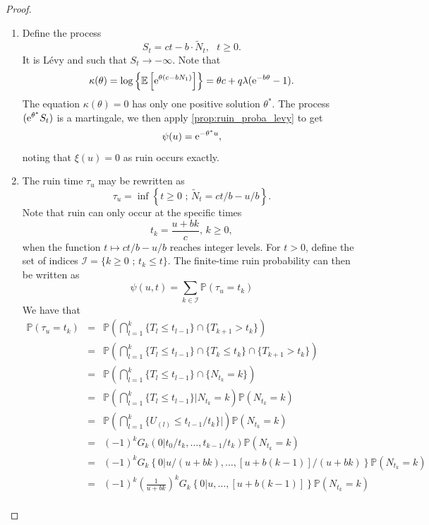 \begin{proof}
\begin{enumerate}
  \item Define the process 
  \[
  S_t = ct -  b\cdot\tilde{N}_t,\text{ }t\geq0.
  \]
  It is L\'evy and such that $S_t\rightarrow-\infty$. Note that 
  \[
  \kappa(\theta) = \log\left\{\mathbb{E}\left[\mathrm{e}^{\theta(c-bN_1)}\right]\right\} = \theta c+q\lambda(\mathrm{e}^{-b\theta}-1).
  \]
  The equation $\kappa(\theta) = 0$ has only one positive solution $\theta^{\ast}$. The process $(\mathrm{e}^{\theta^{\ast}}S_t)$ is a martingale, we then apply \cref{prop:ruin_proba_levy} to get 
  $$
  \psi(u) = \mathrm{e}^{-\theta^{\ast}u},
  $$
  noting that $\xi(u) = 0$ as ruin occurs exactly.
  \item The ruin time $\tau_u$ may be rewritten as 
\begin{equation*}
\tau_u = \inf\left\{t\geq 0\text{ ; }\tilde{N}_t = {ct}/{b} - {u}/{b}\right\}.
\end{equation*}
Note that ruin can only occur at the specific times 
$$
t_k = \frac{u+bk}{c}\text{, }k \geq0,
$$
when the function $t\mapsto {ct}/{b} - {u}/{b}$ reaches integer levels. For $t>0$, define the set of indices $\mathcal{I} = \{k\geq0\text{ ; }t_k\leq t\}$. The finite-time ruin probability can then be written as 
\begin{equation*}
\psi(u,t)=\sum_{k\in\mathcal{I}}\mathbb{P}(\tau_u = t_k)
\end{equation*}
We have that 
\begin{eqnarray*}
\mathbb{P}(\tau_u = t_k) &=& \mathbb{P}\left(\bigcap_{l = 1}^{k}\{T_l\leq t_{l-1}\}\cap\{T_{k+1}> t_k\}\right)\\
&=& \mathbb{P}\left(\bigcap_{l = 1}^{k}\{T_l\leq t_{l-1}\}\cap\{T_{k} \leq t_k\}\cap\{T_{k+1} > t_k\}\right)\\
&=& \mathbb{P}\left(\bigcap_{l = 1}^{k}\{T_l\leq t_{l-1}\}\cap\{N_{t_k} = k\}\right)\\
&=& \mathbb{P}\left(\bigcap_{l = 1}^{k}\{T_l\leq t_{l-1}\}|N_{t_k} = k\right)\mathbb{P}(N_{t_k} = k)\\
&=&\mathbb{P}\left(\bigcap_{l = 1}^{k}\{U_{(l)}\leq t_{l-1}/t_k\}|\right)\mathbb{P}(N_{t_k} = k)\\
&=&(-1)^kG_{k}(0|t_0/t_k, \ldots, t_{k-1}/t_k)\mathbb{P}(N_{t_k} = k)\\
&=&(-1)^kG_{k}\left\{0|u/(u+bk), \ldots, [u+b(k-1)]/(u+bk)\right\}\mathbb{P}(N_{t_k} = k)\\
&=&(-1)^k\left(\frac{1}{u+bk}\right)^{k}G_{k}\left\{0|u, \ldots, [u+b(k-1)]\right\}\mathbb{P}(N_{t_k} = k)\\

\end{eqnarray*}
\end{enumerate}
\end{proof}
